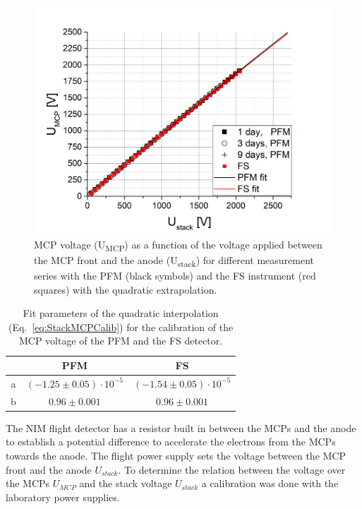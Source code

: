 	\begin{figure}[h!] %
		\centering
		\includegraphics[width=.8\textwidth]{Experiments/PFM_UstackUmccp_TimeEvol.png}
		\caption{MCP voltage (U\textsubscript{MCP}) as a function of the voltage applied between the MCP front and the anode (U\textsubscript{stack}) for different measurement series with the PFM (black symbols) and the FS instrument (red squares) with the quadratic extrapolation.}
		\label{fig:PFMUstackUmcpTimeEvol}
	\end{figure}
	\begin{table}[H] %
		\begin{center}
			\begin{tabular}{c|c|c|}
				& PFM	& FS\\ \hline
				a	& $(-1.25 \pm 0.05)\cdot10^{-5}$ & $(-1.54 \pm 0.05)\cdot10^{-5}$ \\
				b 	& $0.96 \pm 0.001$	& $0.96 \pm 0.001$\\
			\end{tabular}
		\end{center}
		\caption{Fit parameters of the quadratic interpolation (Eq.~\eqref{eq:StackMCPCalib}) for the calibration of the MCP voltage of the PFM and the FS detector.}
		\label{tab:UstackUmcpFitParams}
	\end{table}
	The NIM flight detector has a resistor built in between the MCPs and the anode to establish a potential difference to accelerate the electrons from the MCPs towards the anode. The flight power supply sets the voltage between the MCP front and the anode $U_{stack}$. To determine the relation between the voltage over the MCPs $U_{MCP}$ and the stack voltage $U_{stack}$ a calibration was done with the laboratory power supplies.\\
